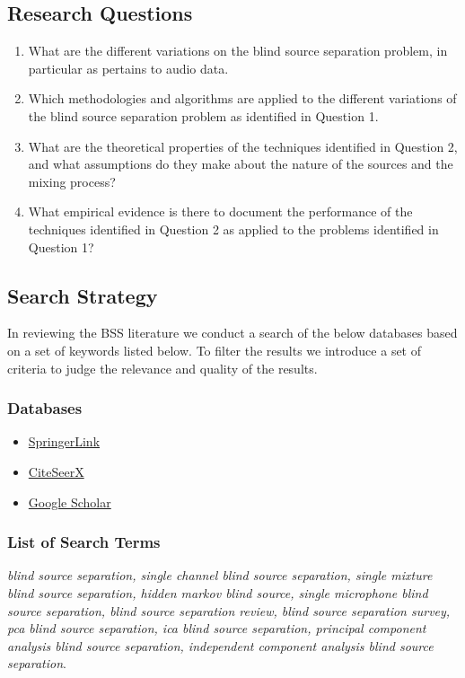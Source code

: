 \documentclass[11pt, oneside, a4paper]{article}
\begin{document}
\subsection{Research Questions}
\begin{enumerate}
  \item What are the different variations on the blind source
    separation problem, in particular as pertains to audio data.
  \item Which methodologies and algorithms are applied to the
    different variations of the blind source separation problem as identified in Question 1.
  \item What are the theoretical properties of the techniques
    identified in Question 2, and  what assumptions do they make about the nature of the sources and the mixing process?
  \item What empirical evidence is there to document the performance
    of the techniques identified in Question 2 as applied to the
    problems identified in Question 1?
\end{enumerate}



\subsection{Search Strategy}
In reviewing the BSS literature we conduct a search of the below databases based on a set of keywords listed below. To filter the results we introduce a set of criteria to judge the relevance and quality of the results.

\subsubsection{Databases}

\begin{itemize}
 \item \href{www.springerlink.com}{SpringerLink}
 \item \href {www.citeseerx}{CiteSeerX}
 \item \href{scholar.google.com}{Google Scholar}
\end{itemize}

\subsubsection{List of Search Terms}

\emph{blind source separation, single channel blind source separation, single mixture blind source separation, hidden markov blind source, single microphone blind source separation, blind source separation review, blind source separation survey, pca blind source separation, ica blind source separation, principal component analysis blind source separation, independent component analysis blind source separation}.
\end{document}
